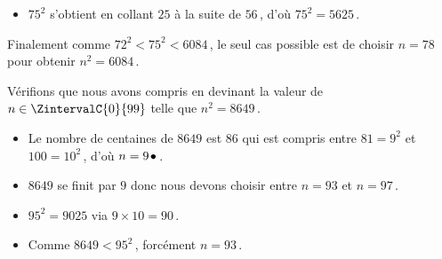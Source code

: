 \begin{method}
\begin{itemize}
		\item $75^2$ s'obtient en collant $25$ à la suite de $56$\,, d'où $75^2=5625$\,.
    \end{itemize}
    
    Finalement comme $72^2 < 75^2 < 6084$\,, le seul cas possible est de choisir $n = 78$ pour obtenir $n^2 = 6084$\,.
    
    \medskip

    Vérifions que nous avons compris en devinant la valeur de $n \in \ZintervalC{0}{99}$ telle que $n^2 = 8649$\,.
    
    \begin{itemize}
		\item Le nombre de centaines de $8649$ est $86$ qui est compris entre $81 = 9^2$ et $100 = 10^2$\,, d'où $n = 9\kern1pt\bullet$\,.
		
    	\item $8649$ se finit par $9$ donc nous devons choisir entre $n = 93$ et $n=97$\,.
		
    	\item $95^2 = 9025$ via $9 \times 10 = 90$\,.
		
    	\item Comme $8649 < 95^2$\,, forcément $n = 93$\,.
    \end{itemize}
\end{method}
